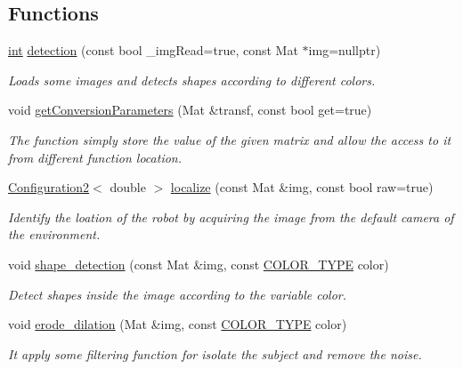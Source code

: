 \subsection*{Functions}
\begin{DoxyCompactItemize}
\item 
\mbox{\hyperlink{draw_8hh_aa620a13339ac3a1177c86edc549fda9b}{int}} \mbox{\hyperlink{detection_8hh_a51eb6bf42d0609ef77c2257d8cc5c3a4}{detection}} (const bool \+\_\+img\+Read=true, const Mat $\ast$img=nullptr)
\begin{DoxyCompactList}\small\item\em Loads some images and detects shapes according to different colors. \end{DoxyCompactList}\item 
void \mbox{\hyperlink{detection_8hh_a8d8ce60a84fb2a955ec798ee17345ce2}{get\+Conversion\+Parameters}} (Mat \&transf, const bool get=true)
\begin{DoxyCompactList}\small\item\em The function simply store the value of the given matrix and allow the access to it from different function location. \end{DoxyCompactList}\item 
\mbox{\hyperlink{class_configuration2}{Configuration2}}$<$ double $>$ \mbox{\hyperlink{detection_8hh_a221d17ea441fc9f21088a76d5c3e1f91}{localize}} (const Mat \&img, const bool raw=true)
\begin{DoxyCompactList}\small\item\em Identify the loation of the robot by acquiring the image from the default camera of the environment. \end{DoxyCompactList}\item 
void \mbox{\hyperlink{detection_8hh_a51c055450044eff527349c24c2747cac}{shape\+\_\+detection}} (const Mat \&img, const \mbox{\hyperlink{detection_8hh_aef17e8300db831cb13df4975928a52cb}{C\+O\+L\+O\+R\+\_\+\+T\+Y\+PE}} color)
\begin{DoxyCompactList}\small\item\em Detect shapes inside the image according to the variable \textquotesingle{}color\textquotesingle{}. \end{DoxyCompactList}\item 
void \mbox{\hyperlink{detection_8hh_a29a46cee302e076e220603d6bb55f8b5}{erode\+\_\+dilation}} (Mat \&img, const \mbox{\hyperlink{detection_8hh_aef17e8300db831cb13df4975928a52cb}{C\+O\+L\+O\+R\+\_\+\+T\+Y\+PE}} color)
\begin{DoxyCompactList}\small\item\em It apply some filtering function for isolate the subject and remove the noise. \end{DoxyCompactList}\item 

\end{DoxyCompactItemize}
